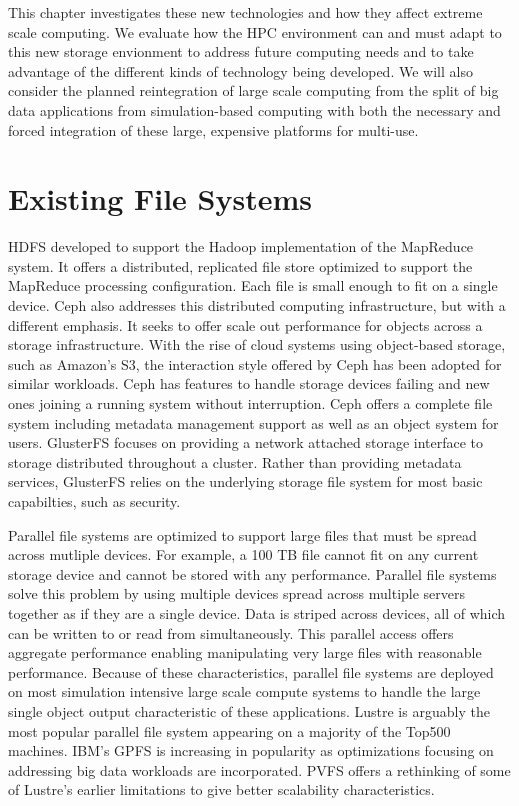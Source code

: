 This chapter investigates these new technologies and how they affect extreme
scale computing. We evaluate how the HPC environment can and must adapt to this
new storage envionment to address future computing needs and to take advantage
of the different kinds of technology being developed. We will also consider the
planned reintegration of large scale computing from the split of big data
applications from simulation-based computing with both the necessary and forced
integration of these large, expensive platforms for multi-use.

\section{Existing File Systems}

HDFS developed to support the Hadoop implementation of the MapReduce system. It
offers a distributed, replicated file store optimized to support the MapReduce
processing configuration. Each file is small enough to fit on a single device.
Ceph also addresses this distributed computing infrastructure, but with a
different emphasis. It seeks to offer scale out performance for objects across
a storage infrastructure. With the rise of cloud systems using object-based
storage, such as Amazon's S3, the interaction style offered by Ceph has been
adopted for similar workloads. Ceph has features to handle storage devices
failing and new ones joining a running system without interruption. Ceph offers
a complete file system including metadata management support as well as an
object system for users. GlusterFS focuses on providing a network attached
storage interface to storage distributed throughout a cluster. Rather than
providing metadata services, GlusterFS relies on the underlying storage file
system for most basic capabilties, such as security.

Parallel file systems are optimized to support large files that must be spread
across mutliple devices. For example, a 100 TB file cannot fit on any current
storage device and cannot be stored with any performance. Parallel file systems
solve this problem by using multiple devices spread across multiple servers
together as if they are a single device. Data is striped across devices, all of
which can be written to or read from simultaneously. This parallel access
offers aggregate performance enabling manipulating very large files with
reasonable performance. Because of these characteristics, parallel file systems
are deployed on most simulation intensive large scale compute systems to handle
the large single object output characteristic of these applications.  Lustre is
arguably the most popular parallel file system appearing on a majority of the
Top500 machines. IBM's GPFS is increasing in popularity as optimizations
focusing on addressing big data workloads are incorporated. PVFS offers a
rethinking of some of Lustre's earlier limitations to give better scalability
characteristics.

